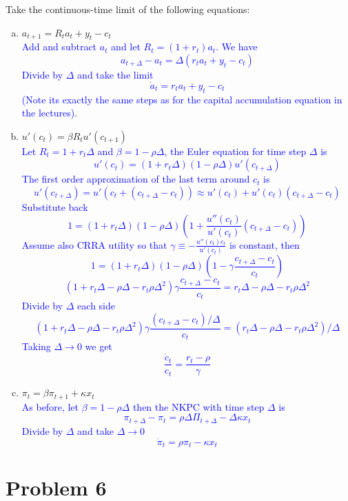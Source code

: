 \documentclass[11pt]{extarticle}
\theoremstyle{plain}
\theoremstyle{definition}
\begin{document}
Take the continuous-time limit of the following equations:
\begin{enumerate}[(a)]
\item $a_{t+1} = R_t a_t + y_t - c_t$ \\

\textcolor{blue}{Add and subtract $a_t$ and let $R_t = (1+r_t)a_t$. We have $$a_{t+\Delta}-a_t= \Delta (r_t a_t+y_t-c_t)$$
Divide by $\Delta$ and take the limit $$\dot a_t = r_t a_t + y_t - c_t$$ (Note its exactly the same steps as for the capital accumulation equation in the lectures).}

\item $u'(c_t) = \beta R_t u'(c_{t+1})$ \\

\textcolor{blue}{Let $R_t=1+r_t \Delta$ and $\beta = 1-\rho \Delta$, the Euler equation for time step $\Delta$ is $$u'(c_t)=(1+r_t \Delta )(1-\rho \Delta)u'(c_{t+\Delta})$$ The first order approximation of the last term around $c_t$ is $$u'(c_{t+\Delta})=u'(c_{t}+(c_{t+\Delta}-c_t))\approx u'(c_t)+u'(c_t)(c_{t+\Delta}-c_t)$$ Substitute back $$1=(1+r_t \Delta )(1-\rho \Delta)(1+\frac{u''(c_t)}{u'(c_t)}(c_{t+\Delta}-c_t))$$ Assume also CRRA utility so that $\gamma \equiv -\frac{u''(c_t)c_t}{u'(c_t)}$ is constant, then  $$1=(1+r_t \Delta )(1-\rho \Delta)(1-\gamma \frac{c_{t+\Delta}-c_t}{c_t})$$ $$(1+r_t \Delta-\rho \Delta - r_t \rho \Delta^2)\gamma \frac{c_{t+\Delta}-c_t}{c_t}=r_t \Delta-\rho \Delta - r_t \rho \Delta^2$$ Divide by $\Delta$ each side $$(1+r_t \Delta-\rho \Delta -r_t \rho \Delta^2)\gamma \frac{(c_{t+\Delta}-c_t)/\Delta}{c_t}=(r_t \Delta-\rho \Delta - r_t \rho \Delta^2)/\Delta$$ Taking $\Delta \rightarrow 0$ we get $$\frac{\dot c_t}{c_t} = \frac{r_t - \rho}{\gamma}$$}

\item $\pi_t = \beta \pi_{t+1} + \kappa x_t$ \\

\textcolor{blue}{As before, let $\beta = 1-\rho \Delta$ then the NKPC with time step $\Delta$ is $$\pi_{t+\Delta}-\pi_t = \rho \Delta \Pi_{t+\Delta}-\Delta \kappa x_t$$ Divide by $\Delta$ and take $\Delta \rightarrow 0$ $$\dot{\pi}_t = \rho \pi_t - \kappa x_t$$}
\end{enumerate}


\vspace{10mm}
\section*{Problem 6}
\end{document}
